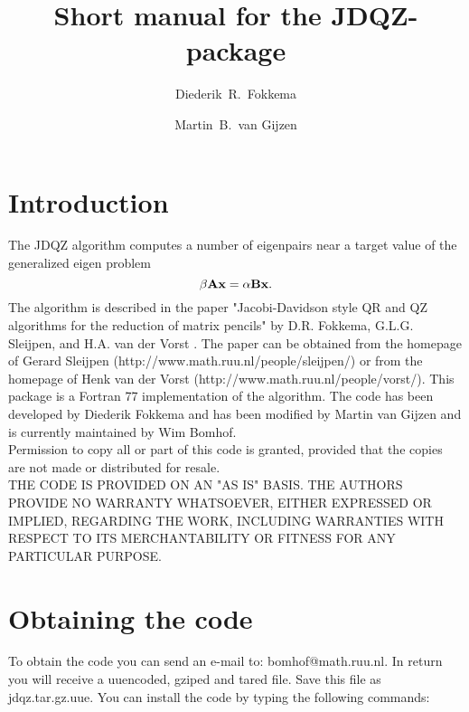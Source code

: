 \documentclass[12pt,a4paper]{article}
\title{Short manual for the JDQZ-package}
\author{Diederik~R.\ Fokkema%
\footnotemark[1]\hspace{1ex}
    \and
  Martin~B.\ van Gijzen\footnotemark[3]}
\def\BA{{\bf A}}\def\BB{{\bf B}}
\def\Bx{{\bf x}}\def\Br{{\bf r}}
\begin{document}
\maketitle
 \renewcommand{\thefootnote}{\fnsymbol{footnote}}

 \renewcommand{\thefootnote}{\arabic{footnote}}

\section{Introduction}
The JDQZ algorithm computes a number of eigenpairs near a target value of the 
generalized eigen problem
\begin{equation}
  \beta \BA \Bx = \alpha \BB \Bx .
  \label{eq:system}
\end{equation}
The algorithm is described in the paper
"Jacobi-Davidson style QR and QZ algorithms for the reduction of matrix pencils" by D.R. Fokkema, G.L.G. Sleijpen, and H.A. van der Vorst \cite{jdqz}. 
The paper can be obtained from the homepage of Gerard Sleijpen 
(http://www.math.ruu.nl/people/sleijpen/) or from the homepage of Henk van der 
Vorst (http://www.math.ruu.nl/people/vorst/). 
This package is a Fortran 77 implementation of the algorithm.
The code has been developed
by Diederik Fokkema and has been modified by Martin van Gijzen and is currently maintained by 
Wim Bomhof. \\
Permission to copy all or part of this code is granted, provided
that the copies are not made or distributed for resale.\\
THE CODE IS PROVIDED ON AN "AS IS" BASIS.  THE AUTHORS PROVIDE NO
WARRANTY WHATSOEVER, EITHER EXPRESSED OR IMPLIED, REGARDING THE WORK,
INCLUDING WARRANTIES WITH RESPECT TO ITS MERCHANTABILITY OR FITNESS
FOR ANY PARTICULAR PURPOSE.\\
\section{Obtaining the code}
To obtain the code you can send an e-mail to: bomhof@math.ruu.nl.
In return you will receive a uuencoded, gziped and tared file.
Save this file as jdqz.tar.gz.uue.
You can install the code by typing the following commands:\\
\end{document}

